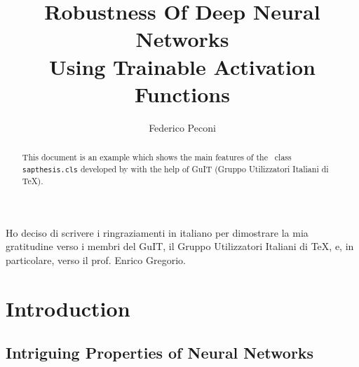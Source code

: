 \documentclass[LaM,binding=0.6cm]{./packages/sapthesis/sapthesis}
\title{Robustness Of Deep Neural Networks \\Using Trainable Activation Functions}
\author{Federico Peconi}
\begin{document}
\frontmatter

\maketitle
\dedication{Dedicated to\\ Donald Knuth}

\begin{abstract}
This document is an example which shows the main features of
the \LaTeXe\ class \texttt{sapthesis.cls} developed by 
with the help of GuIT (Gruppo Utilizzatori Italiani di \TeX).
\end{abstract}

\begin{acknowledgments}
Ho deciso di scrivere i ringraziamenti in italiano
per dimostrare la mia gratitudine verso i membri
del GuIT, il Gruppo Utilizzatori Italiani di \TeX, e, in particolare,
verso il prof. Enrico Gregorio.
\end{acknowledgments}

\tableofcontents


\mainmatter

\chapter{Introduction}

    \section{Intriguing Properties of Neural Networks}
\end{document}
